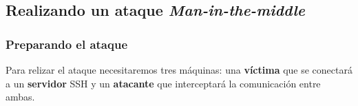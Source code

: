 \documentclass[10pt,a4paper,spanish]{article}
\begin{document}

\subsection{Realizando un ataque \textit{Man-in-the-middle}}
\subsubsection{Preparando el ataque}
Para relizar el ataque necesitaremos tres máquinas: una \textbf{víctima} que se conectará a un \textbf{servidor} SSH y un \textbf{atacante} que interceptará la comunicación entre ambas.
\end{document}
